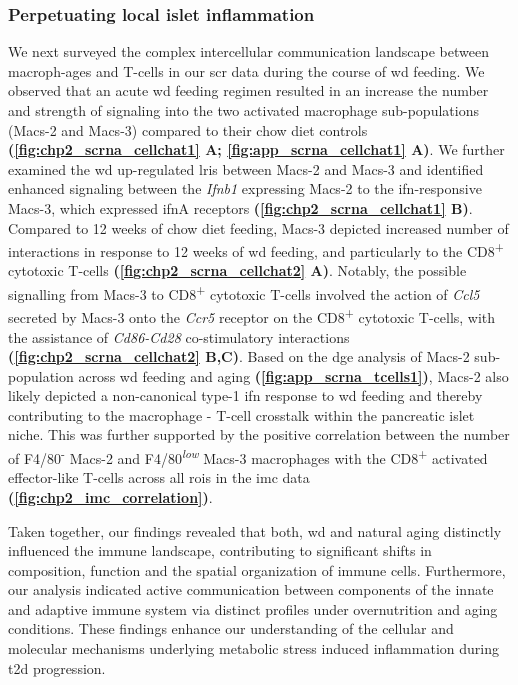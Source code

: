 \subsubsection{Perpetuating local islet inflammation}
We next surveyed the complex intercellular communication landscape between macroph-ages and T-cells in our \gls{scr} data during the course of \gls{wd} feeding. We observed that an acute \gls{wd} feeding regimen resulted in an increase the number and strength of signaling into the two activated macrophage sub-populations (Macs-2 and Macs-3) compared to their chow diet controls \textbf{(\autoref{fig:chp2_scrna_cellchat1} A; \autoref{fig:app_scrna_cellchat1} A)}. We further examined the  \gls{wd} up-regulated \glspl{lri} between Macs-2 and Macs-3 and identified enhanced signaling between the \textit{Ifnb1} expressing Macs-2 to the \gls{ifn}-responsive Macs-3, which expressed \gls{ifn}A receptors \textbf{(\autoref{fig:chp2_scrna_cellchat1} B)}. Compared to 12 weeks of chow diet feeding, Macs-3 depicted increased  number of interactions in response to 12 weeks of \gls{wd} feeding, and particularly to the CD8\textsuperscript{+} cytotoxic T-cells \textbf{(\autoref{fig:chp2_scrna_cellchat2} A)}. 
Notably, the possible signalling from Macs-3 to CD8\textsuperscript{+} cytotoxic T-cells involved the action of \textit{Ccl5} secreted by Macs-3 onto the \textit{Ccr5} receptor on the CD8\textsuperscript{+} cytotoxic T-cells, with the assistance of \textit{Cd86-Cd28} co-stimulatory interactions \textbf{(\autoref{fig:chp2_scrna_cellchat2} B,C)}. Based on the \gls{dge} analysis of Macs-2 sub-population across \gls{wd} feeding and aging \textbf{(\autoref{fig:app_scrna_tcells1})}, Macs-2 also likely depicted a non-canonical type-1 \gls{ifn} response to \gls{wd} feeding and thereby contributing to the macrophage - T-cell crosstalk within the pancreatic islet niche. This was further supported by the positive correlation between the number of F4/80\textsuperscript{-} Macs-2 and F4/80\textsuperscript{\textit{low}} Macs-3 macrophages with the CD8\textsuperscript{+} activated effector-like T-cells across all \glspl{roi} in the \gls{imc} data \textbf{(\autoref{fig:chp2_imc_correlation})}.\\
\par Taken together, our findings revealed that both, \gls{wd} and natural aging distinctly influenced the immune landscape, contributing to significant shifts in composition, function and the spatial organization of immune cells. Furthermore, our analysis indicated active communication between components of the innate and adaptive immune system via distinct profiles under overnutrition and aging conditions. These findings enhance our understanding of the cellular and molecular mechanisms underlying metabolic stress induced inflammation during \gls{t2d} progression.



